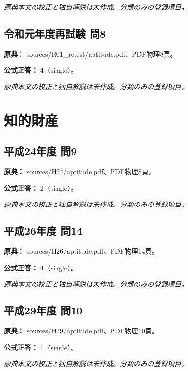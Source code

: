 \par\textit{原典本文の校正と独自解説は未作成。分類のみの登録項目。}

\subsection{令和元年度再試験 問8}
\label{q:r01-ret-apt-08}

\noindent\textbf{原典：} sources/R01\_retest/aptitude.pdf、PDF物理8頁。

\textbf{公式正答：} 4（single）。

\par\textit{原典本文の校正と独自解説は未作成。分類のみの登録項目。}

\section{知的財産}

\subsection{平成24年度 問9}
\label{q:h24-reg-apt-09}

\noindent\textbf{原典：} sources/H24/aptitude.pdf、PDF物理8頁。

\textbf{公式正答：} 2（single）。

\par\textit{原典本文の校正と独自解説は未作成。分類のみの登録項目。}

\subsection{平成26年度 問14}
\label{q:h26-reg-apt-14}

\noindent\textbf{原典：} sources/H26/aptitude.pdf、PDF物理14頁。

\textbf{公式正答：} 4（single）。

\par\textit{原典本文の校正と独自解説は未作成。分類のみの登録項目。}

\subsection{平成29年度 問10}
\label{q:h29-reg-apt-10}

\noindent\textbf{原典：} sources/H29/aptitude.pdf、PDF物理10頁。

\textbf{公式正答：} 1（single）。

\par\textit{原典本文の校正と独自解説は未作成。分類のみの登録項目。}

